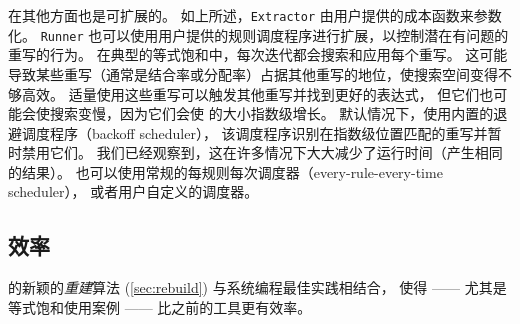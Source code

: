 \egg 在其他方面也是可扩展的。
如上所述，\texttt{Extractor} 由用户提供的成本函数来参数化。%
\texttt{Runner} 也可以使用用户提供的规则调度程序进行扩展，以控制潜在有问题的重写的行为。
\label{sec:rule-scheduling}
在典型的等式饱和中，每次迭代都会搜索和应用每个重写。
这可能导致某些重写（通常是结合率或分配率）占据其他重写的地位，使搜索空间变得不够高效。
适量使用这些重写可以触发其他重写并找到更好的表达式，
  但它们也可能会使搜索变慢，因为它们会使 \egraph 的大小指数级增长。
默认情况下，\egg 使用内置的退避调度程序（backoff scheduler），
  该调度程序识别在指数级位置匹配的重写并暂时禁用它们。
我们已经观察到，这在许多情况下大大减少了运行时间（产生相同的结果）。
\egg 也可以使用常规的每规则每次调度器（every-rule-every-time scheduler），
  或者用户自定义的调度器。

\subsection{效率}
\label{sec:egg-efficient}

\egg 的新颖的\textit{重建}算法 (\autoref{sec:rebuild}) 与系统编程最佳实践相结合，
  使得 \egraphs —— 尤其是等式饱和使用案例 —— 比之前的工具更有效率。

